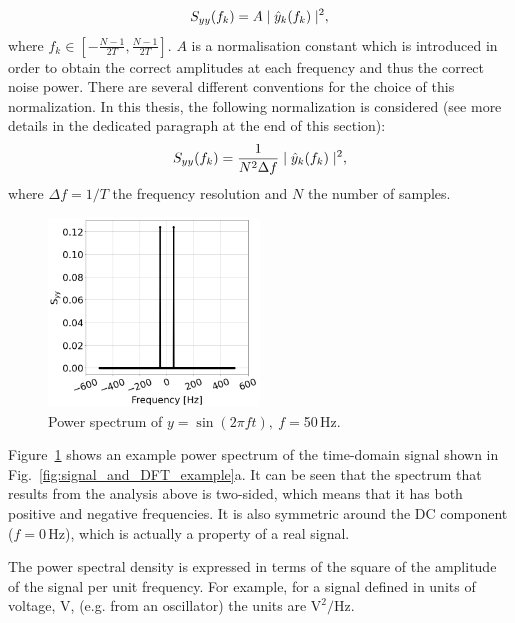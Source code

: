\begin{equation}\label{eq:Sxx_definition_discrete_not_normalised}
    S_{yy}(f_k) = A \mid \hat{y}_k(f_k) \mid ^2,
\end{equation}
where $f_k \in \left[-\frac{N-1}{2T},\frac{N-1}{2T} \right]$. $A$ is a normalisation constant which is introduced in order to obtain the correct amplitudes at each frequency and thus the correct noise power. There are several different conventions for the choice of this normalization. In this thesis, the following normalization is considered (see more details in the dedicated paragraph at the end of this section):
\begin{equation}\label{eq:Sxx_definition_discrete_normalized}
    S_{yy}(f_k) = \frac{1}{N^2 \Delta f} \mid \hat{y}_k(f_k) \mid ^2,
\end{equation}
where  $\Delta f = 1/T$ the frequency resolution and $N$ the number of samples.
    
\begin{figure}[!ht]
    \centering         
    \includegraphics[width=0.5\textwidth]{./images/app_B/simple_signal_1freq_psd_example.png}
        \caption{Power spectrum of $y=\sin(2 \pi f t),\ f = $50\,Hz.}
        \label{fig:psd_example_two_sided}
\end{figure}

Figure~\ref{fig:psd_example_two_sided} shows an example power spectrum of the time-domain signal shown in Fig.~\ref{fig:signal_and_DFT_example}a. It can be seen that the spectrum that results from the analysis above is two-sided, which means that it has both positive and negative frequencies. It is also symmetric around the DC component ($f = $0\,Hz), which is actually a property of a real signal. 

The power spectral density is expressed in terms of the square of the amplitude of the signal per unit frequency. For example, for a signal defined in units of voltage, V, (e.g. from an oscillator) the units are $\mathrm{V^2/Hz}$.

